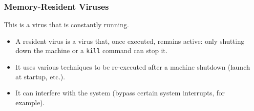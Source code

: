 \documentclass{beamer}
\begin{document}



\begin{frame}
\frametitle{Memory-Resident Viruses}
This is a virus that is {\color{blue} constantly running.}
\begin{itemize}
\item A resident virus is a virus that, once executed, remains active: only shutting down the machine or a \texttt{kill} command can stop it.
\item It uses various techniques to be re-executed after a machine shutdown (launch at startup, etc.).
\item It can interfere with the system (bypass certain system interrupts, for example).
\end{itemize}
\end{frame}






\end{document}
